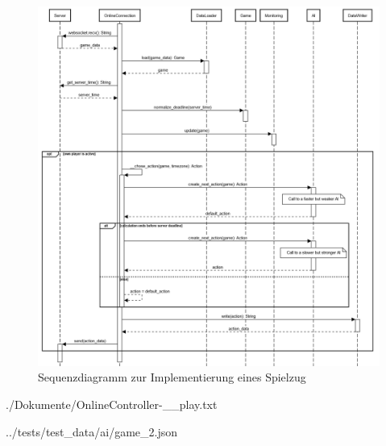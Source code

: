 \begin{figure}[htb]
	\centering
	\includegraphics[width=\textwidth]{Bilder/Sequenzdiagramm_Implementierung_Spielzug.png}
	\caption{Sequenzdiagramm zur Implementierung eines Spielzug}
	\label{fig:sequenzdiagramm-spielzug}
\end{figure}

\begin{minipage}{\textwidth}
	
	{./Dokumente/OnlineController-__play.txt}
\end{minipage}

\begin{minipage}{\textwidth}
	
	{../tests/test_data/ai/game_2.json}
\end{minipage}

